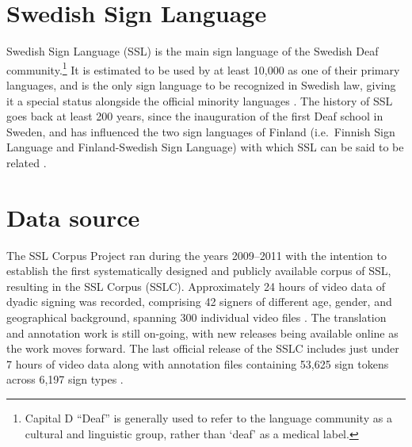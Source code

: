 \documentclass[11pt]{article}
\begin{document}
\section{Swedish Sign Language}

Swedish Sign Language (SSL) is the main sign language of the Swedish Deaf community.\footnote{Capital D ``Deaf'' is generally used to refer to the language community as a cultural and linguistic group, rather than `deaf' as a medical label.} It is estimated to be used by at least 10,000 as one of their primary languages, and is the only sign language to be recognized in Swedish law, giving it a special status alongside the official minority languages \cite{Ahlgren2006sou,Parkvall2015siffror}. The history of SSL goes back at least 200 years, since the inauguration of the first Deaf school in Sweden, and has influenced the two sign languages of Finland (i.e.~Finnish Sign Language and Finland-Swedish Sign Language) with which SSL can be said to be related \cite{Bergman2010transmission}.

\section{Data source}

The SSL Corpus Project ran during the years 2009--2011 with the intention to establish the first systematically designed and publicly available corpus of SSL, resulting in the SSL Corpus (SSLC). Approximately 24 hours of video data of dyadic signing was recorded, comprising 42 signers of different age, gender, and geographical background, spanning 300 individual video files \cite{Mesch2012signed}. The translation and annotation work is still on-going, with new releases being available online as the work moves forward. The last official release of the SSLC includes just under 7 hours of video data \cite{Mesch2012dataset} along with annotation files containing 53,625 sign tokens across 6,197 sign types \cite{Mesch2016annotated}. 
\end{document}
